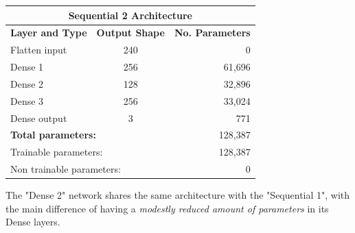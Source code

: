 \documentclass[13pt]{article}
\begin{document}
\begin{center}
    \begin{tabular}{| l | c | r |}
        \hline
        \multicolumn{3}{|c|}{\textbf{Sequential 2 Architecture}} \\
        \hline
        \hline
        \textbf{Layer and Type} & \textbf{Output Shape} & \textbf{No. Parameters} \\
        \hline
        Flatten input & 240 & 0 \\
        Dense 1 & 256 & 61,696 \\
        Dense 2 & 128 & 32,896 \\
        Dense 3 & 256 & 33,024 \\
        Dense output & 3 & 771 \\
        \hline
        \multicolumn{2}{|l|}{\textbf{Total parameters:}} & 128,387 \\
        \multicolumn{2}{|l|}{Trainable parameters:} & 128,387 \\
        \multicolumn{2}{|l|}{Non trainable parameters:} & 0 \\
        \hline
    \end{tabular}
\end{center}

The "Dense 2" network shares the same architecture with the "Sequential 1", with the main difference of having a \textit{modestly reduced amount of parameters} in its Dense layers.
\end{document}
